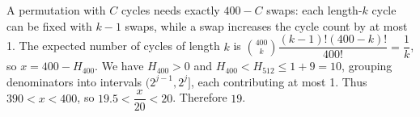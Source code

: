 A permutation with $C$ cycles needs exactly $400-C$ swaps: each length-$k$ cycle can be fixed with $k-1$ swaps, while a swap increases the cycle count by at most 1. The expected number of cycles of length $k$ is $\binom{400}{k}\dfrac{(k-1)!(400-k)!}{400!}=\dfrac{1}{k}$, so $x=400-H_{400}$. We have $H_{400}>0$ and $H_{400}<H_{512}\le1+9=10$, grouping denominators into intervals $(2^{j-1},2^j]$, each contributing at most 1. Thus $390<x<400$, so $19.5<\dfrac{x}{20}<20$. Therefore $\boxed{19}$.
